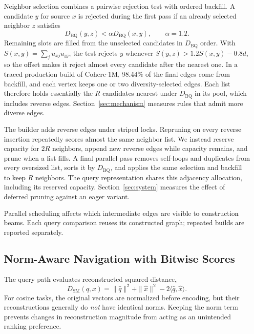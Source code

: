 Neighbor selection combines a pairwise rejection test with ordered backfill. A candidate $y$ for source $x$ is rejected during the first pass if an already selected neighbor $z$ satisfies
\begin{equation}
    D_{\mathrm{BQ}}(y,z)<\alpha D_{\mathrm{BQ}}(x,y),
    \qquad \alpha=1.2.
    \label{eq:prune}
\end{equation}
Remaining slots are filled from the unselected candidates in $D_{\mathrm{BQ}}$ order. With $S(x,y)=\sum_j u_{xj}u_{yj}$, the test rejects $y$ whenever $S(y,z)>1.2S(x,y)-0.8d$, so the offset makes it reject almost every candidate after the nearest one. In a traced production build of Cohere-1M, 98.44\% of the final edges come from backfill, and each vertex keeps one or two diversity-selected edges. Each list therefore holds essentially the $R$ candidates nearest under $D_{\mathrm{BQ}}$ in its pool, which includes reverse edges. Section~\ref{sec:mechanism} measures rules that admit more diverse edges.

The builder adds reverse edges under striped locks. Repruning on every reverse insertion repeatedly scores almost the same neighbor list. We instead reserve capacity for $2R$ neighbors, append new reverse edges while capacity remains, and prune when a list fills. A final parallel pass removes self-loops and duplicates from every oversized list, sorts it by $D_{\mathrm{BQ}}$, and applies the same selection and backfill to keep $R$ neighbors. The query representation shares this adjacency allocation, including its reserved capacity. Section~\ref{sec:system} measures the effect of deferred pruning against an eager variant.

Parallel scheduling affects which intermediate edges are visible to construction beams. Each query comparison reuses its constructed graph; repeated builds are reported separately.

\subsection{Norm-Aware Navigation with Bitwise Scores}
\label{sec:score}
The query path evaluates reconstructed squared distance,
\begin{equation}
    D_{\mathrm{SM}}(q,x)=
    \|\widehat q\|^2+\|\widehat x\|^2
    -2\langle\widehat q,\widehat x\rangle .
    \label{eq:l2}
\end{equation}
For cosine tasks, the original vectors are normalized before encoding, but their reconstructions generally do \emph{not} have identical norms. Keeping the norm term prevents changes in reconstruction magnitude from acting as an unintended ranking preference.

